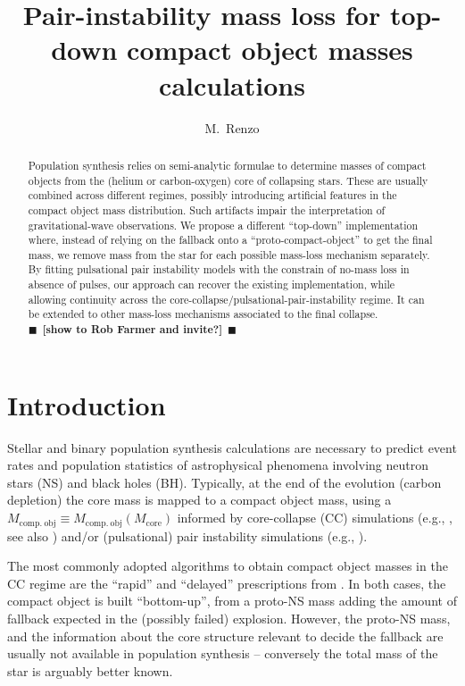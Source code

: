 \documentclass[twocolumn]{aastex63}
\newcommand{\todo}[1]{{\large $\blacksquare$~\textbf{\color{red}[#1]}}~$\blacksquare$}
\begin{document}
\title{Pair-instability mass loss for top-down compact object masses calculations}

\author[0000-0002-6718-9472]{M.~Renzo}


\begin{abstract}
  Population synthesis relies on semi-analytic formulae to determine
  masses of compact objects from the (helium or carbon-oxygen) core
  of collapsing stars. These are usually combined across
  different regimes, possibly introducing artificial features in the
  compact object mass distribution. Such artifacts impair the
  interpretation of gravitational-wave observations. We propose a different
  ``top-down'' implementation where, instead of relying on the
  fallback onto a ``proto-compact-object'' to get
  the final mass, we remove mass from the star for
  each possible mass-loss mechanism separately. By fitting pulsational
  pair instability models with the constrain of no-mass loss in
  absence of pulses, our approach can recover the existing
  implementation, while allowing continuity across the
  core-collapse/pulsational-pair-instability regime. It can be
  extended
  to other mass-loss mechanisms associated to the final collapse.\\

  \todo{show to Rob Farmer and invite?}
\end{abstract}

\section{Introduction}

Stellar and binary population synthesis calculations are necessary to
predict event rates and population statistics of astrophysical
phenomena involving neutron stars (NS) and
black holes (BH). Typically, at the end of the evolution (carbon
depletion) the core mass is mapped to a compact object mass, using a
$M_\mathrm{comp.\ obj}\equiv M_\mathrm{comp.\ obj}(M_\mathrm{core})$
informed by core-collapse (CC) simulations (e.g., \citealt{fryer:12,
  spera:15, mandel:20, couch:20}, see also \citealt{zapartas:21, patton:21}) and/or (pulsational) pair instability simulations
(e.g., \citealt{belczynski:16, woosley:17, spera:17, stevenson:19,
  marchant:19, farmer:19, costa:21}).

The most commonly adopted algorithms to obtain compact object masses
in the CC regime are the ``rapid'' and ``delayed''
prescriptions from \cite{fryer:12}. In both cases, the compact object
is built ``bottom-up'', from a proto-NS mass adding the amount of
fallback expected in the (possibly failed) explosion. However, the
proto-NS mass, and the information about the core structure relevant
to decide the fallback are usually not available in population
synthesis \citep[e.g.,][]{patton:20} -- conversely the total mass of
the star is arguably better known. %
\end{document}

